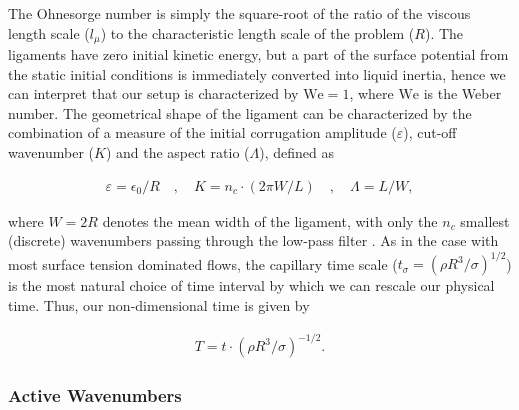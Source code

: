 The Ohnesorge number is simply the square-root of the ratio  
of the viscous length scale ($l_\mu$)  
to the characteristic length scale of the problem ($R$).
The ligaments have zero initial kinetic energy, 
but a part of the surface potential from the static initial conditions 
is immediately converted into liquid inertia, 
hence we can interpret that our setup is characterized 
by $\textrm{We} = 1$, where $\textrm{We}$ is the Weber number.
The geometrical shape of the ligament can 
be characterized by the combination of a measure of the initial
corrugation amplitude ($\varepsilon$),
cut-off wavenumber ($K$) and the aspect ratio ($\Lambda$), defined as   

\begin{align}
 \varepsilon = \epsilon_0 / R \quad , \quad K = n_c \cdot \left(2\pi W/ L \right) \quad
	, \quad \Lambda = L / W , 
\end{align}

where $W = 2R$ denotes the mean width of the ligament, with only
the $n_c$ smallest (discrete) wavenumbers passing through the low-pass filter .
As in the case with most surface tension dominated flows, 
the capillary time scale ($t_\sigma = (\rho R^3 / \sigma)^{1/2}$) is the most 
natural choice of time interval by which we can rescale our physical time.
Thus, our non-dimensional time is given by 

\begin{align}
	T = t \cdot \left(\rho R^3 / \sigma \right)^{-1/2} . 
\end{align}


\subsubsection*{Active Wavenumbers}

